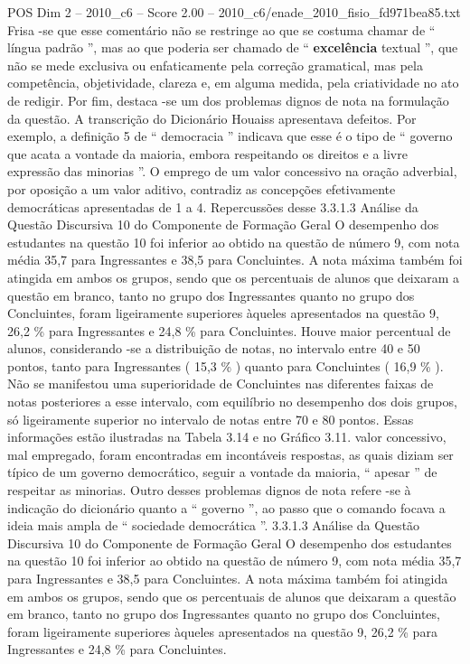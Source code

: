 \begin{textsample}{POS Dim 2 – 2010\_c6 – Score 2.00 – 2010\_c6/enade\_2010\_fisio\_fd971bea85.txt}
Frisa -se que esse comentário não se restringe ao que se costuma chamar de “ língua padrão ”, mas ao que poderia ser chamado de “ \textbf{excelência} textual ”, que não se mede exclusiva ou enfaticamente pela correção gramatical, mas pela competência, objetividade, clareza e, em alguma medida, pela criatividade no ato de redigir.
Por fim, destaca -se um dos problemas dignos de nota na formulação da questão.
A transcrição do Dicionário Houaiss apresentava defeitos.
Por exemplo, a definição 5 de “ democracia ” indicava que esse é o tipo de “ governo que acata a vontade da maioria, embora respeitando os direitos e a livre expressão das minorias ”.
O emprego de um valor concessivo na oração adverbial, por oposição a um valor aditivo, contradiz as concepções efetivamente democráticas apresentadas de 1 a 4.
Repercussões desse 3.3.1.3 Análise da Questão Discursiva 10 do Componente de Formação Geral O desempenho dos estudantes na questão 10 foi inferior ao obtido na questão de número 9, com nota média 35,7 para Ingressantes e 38,5 para Concluintes.
A nota máxima também foi atingida em ambos os grupos, sendo que os percentuais de alunos que deixaram a questão em branco, tanto no grupo dos Ingressantes quanto no grupo dos Concluintes, foram ligeiramente superiores àqueles apresentados na questão 9, 26,2 \% para Ingressantes e 24,8 \% para Concluintes.
Houve maior percentual de alunos, considerando -se a distribuição de notas, no intervalo entre 40 e 50 pontos, tanto para Ingressantes ( 15,3 \% ) quanto para Concluintes ( 16,9 \% ).
Não se manifestou uma superioridade de Concluintes nas diferentes faixas de notas posteriores a esse intervalo, com equilíbrio no desempenho dos dois grupos, só ligeiramente superior no intervalo de notas entre 70 e 80 pontos.
Essas informações estão ilustradas na Tabela 3.14 e no Gráfico 3.11. valor concessivo, mal empregado, foram encontradas em incontáveis respostas, as quais diziam ser típico de um governo democrático, seguir a vontade da maioria, “ apesar ” de respeitar as minorias.
Outro desses problemas dignos de nota refere -se à indicação do dicionário quanto a “ governo ”, ao passo que o comando focava a ideia mais ampla de “ sociedade democrática ”. 3.3.1.3 Análise da Questão Discursiva 10 do Componente de Formação Geral O desempenho dos estudantes na questão 10 foi inferior ao obtido na questão de número 9, com nota média 35,7 para Ingressantes e 38,5 para Concluintes.
A nota máxima também foi atingida em ambos os grupos, sendo que os percentuais de alunos que deixaram a questão em branco, tanto no grupo dos Ingressantes quanto no grupo dos Concluintes, foram ligeiramente superiores àqueles apresentados na questão 9, 26,2 \% para Ingressantes e 24,8 \% para Concluintes.

\end{textsample}
